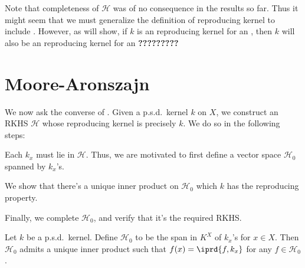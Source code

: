 	
	\begin{rmk} %
		Note that completeness of $\mathscr H$ was of no consequence in the results so far. Thus it might seem that we must generalize the definition of reproducing kernel to include . However, as  will show, if $k$ is an reproducing kernel for an \IPS, then $k$ will also be an reproducing kernel for an \textbf{?????????}
	\end{rmk}
	
	
	
	
	
\section{Moore-Aronszajn}

	We now ask the converse of . Given a p.s.d.\ kernel $k$ on $X$, we construct an RKHS $\mathscr H$ whose reproducing kernel is precisely $k$. We do so in the following steps:
	\begin{mylist}
		\item Each $k_x$ must lie in $\mathscr H$. Thus, we are motivated to first define a vector space $\mathscr H_0$ spanned by $k_x$'s.
		
		\item We show that there's a unique inner product on $\mathscr H_0$ \wrt which $k$ has the reproducing property.
		
		\item Finally, we complete $\mathscr H_0$, and verify that it's the required RKHS.
	\end{mylist}


	\begin{lem}\label{LEM: space H_0}
		Let $k$ be a p.s.d.\ kernel. Define $\mathscr H_0$ to be the span in $K^X$ of $k_x$'s for $x\in X$. Then $\mathscr H_0$ admits a unique inner product such that $f(x) = \iprd{f, k_x}$ for any $f\in\mathscr H_0$.
	\end{lem}
	
